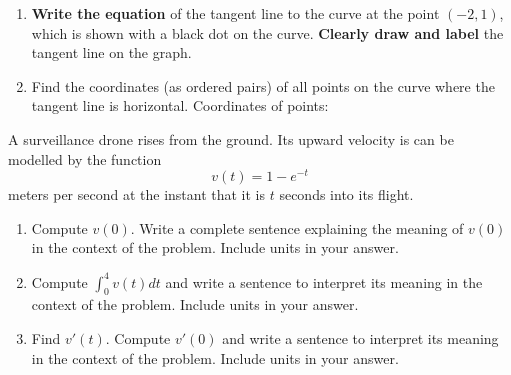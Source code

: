 \documentclass[12pt]{article}
\renewcommand{\emph}[1]{\textsf{\textbf{#1}}}
\newcounter{probcount}
\newcounter{subprobcount}
\def\problem#1{\setcounter{subprobcount}{0}%
\addtocounter{probcount}{1}{\emph{\arabic{probcount}.\hskip 1em(#1)}}\par}
\newenvironment{subproblems}{%
\begin{enumerate}%
\setcounter{enumi}{\value{subprobcount}}%
\renewcommand{\theenumi}{\emph{\alph{enumi}}}}%
{\setcounter{subprobcount}{\value{enumi}}\end{enumerate}}
\begin{document}
\begin{subproblems}
\item \emph{Write the equation} of the tangent line to the curve at the point $(-2,1)$, which is shown with a black dot on the curve. \emph{Clearly draw and label} the tangent line on the graph. %
\vspace{2 cm}

\item Find the coordinates (as ordered pairs) of all points on the curve where the tangent line is horizontal.
\vfill
Coordinates of points: \hrulefill
\end{subproblems}
\newpage

\problem{12 points} A surveillance drone rises from the ground. Its upward velocity is can be modelled by the function \[v(t)=1-e^{-t}\] meters per second at the instant that it is $t$ seconds into its flight.
\begin{subproblems}
\item Compute $v(0)$. Write a complete sentence explaining the meaning of $v(0)$ in the context of the problem. Include units in your answer.
\vfill
\item Compute $\displaystyle \int_0^4 v(t)dt$ and write a sentence to interpret its meaning in the context of the problem. Include units in your answer.
\vfill
\item Find $v'(t)$. Compute $v'(0)$ and write a sentence to interpret its meaning in the context of the problem. Include units in your answer.
\vfill
\end{subproblems}
\end{document}
